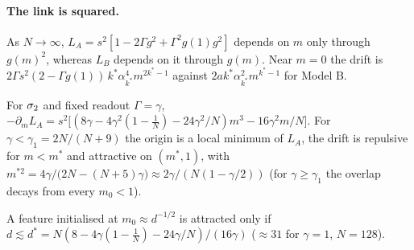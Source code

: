 \paragraph{The link is squared.} As $N\to\infty$, $L_A=s^2[1-2\Gamma g^2+\Gamma^2g(1)g^2]$ depends on $m$ only through $g(m)^2$, whereas
$L_B$ depends on it through $g(m)$. Near $m=0$ the drift is $2\Gamma s^2(2-\Gamma g(1))\,k^*\alpha_{k^*}^4m^{2k^*-1}$ against
$2ak^*\alpha_{k^*}^2m^{k^*-1}$ for Model B.

\begin{proposition}
\label{prop:repulsion}
For $\sigma_2$ and fixed readout $\Gamma=\gamma$, $-\partial_mL_A=s^2\big[(8\gamma-4\gamma^2(1-\tfrac1N)-24\gamma^2/N)m^3-16\gamma^2m/N\big]$. For
$\gamma<\gamma_1=2N/(N+9)$ the origin is a local minimum of $L_A$, the drift is repulsive for $m<m^*$ and attractive on $(m^*,1)$, with
$m^{*2}=4\gamma/\big(2N-(N+5)\gamma\big)\approx2\gamma/(N(1-\gamma/2))$ (for $\gamma\ge\gamma_1$ the overlap decays from every $m_0<1$).
\end{proposition}
A feature initialised at $m_0\approx d^{-1/2}$ is attracted
only if $d\lesssim d^*=N(8-4\gamma(1-\tfrac1N)-24\gamma/N)/(16\gamma)$ ($\approx31$ for $\gamma=1$, $N=128$).

